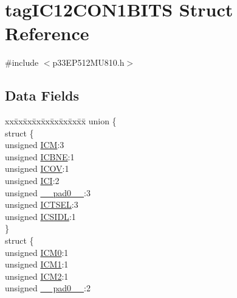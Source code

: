 \hypertarget{structtag_i_c12_c_o_n1_b_i_t_s}{}\section{tag\+I\+C12\+C\+O\+N1\+B\+I\+TS Struct Reference}
\label{structtag_i_c12_c_o_n1_b_i_t_s}


{\ttfamily \#include $<$p33\+E\+P512\+M\+U810.\+h$>$}

\subsection*{Data Fields}
\begin{DoxyCompactItemize}
\item 
\begin{tabbing}
xx\=xx\=xx\=xx\=xx\=xx\=xx\=xx\=xx\=\kill
union \{\\
\>struct \{\\
\>\>unsigned \hyperlink{structtag_i_c12_c_o_n1_b_i_t_s_ad3edde44ecb2d349ffa2decd0a251c20}{ICM}:3\\
\>\>unsigned \hyperlink{structtag_i_c12_c_o_n1_b_i_t_s_a824e7dcca83939e1b049d63ffcee33e9}{ICBNE}:1\\
\>\>unsigned \hyperlink{structtag_i_c12_c_o_n1_b_i_t_s_a49392949376ba0bf58cf8db889e86c94}{ICOV}:1\\
\>\>unsigned \hyperlink{structtag_i_c12_c_o_n1_b_i_t_s_a72486dcb868aad2d5c978494691356cc}{ICI}:2\\
\>\>unsigned \hyperlink{structtag_i_c12_c_o_n1_b_i_t_s_adf71f3d8410c1f1dbbc96680a92c49af}{\_\_pad0\_\_}:3\\
\>\>unsigned \hyperlink{structtag_i_c12_c_o_n1_b_i_t_s_a7a9dd41b5f93eb620df7fa336e452677}{ICTSEL}:3\\
\>\>unsigned \hyperlink{structtag_i_c12_c_o_n1_b_i_t_s_af441b36127c0bb7a35162dfc9a64103c}{ICSIDL}:1\\
\>\} \\
\>struct \{\\
\>\>unsigned \hyperlink{structtag_i_c12_c_o_n1_b_i_t_s_a649b1dd9bca75e558f37a9f52a829bd4}{ICM0}:1\\
\>\>unsigned \hyperlink{structtag_i_c12_c_o_n1_b_i_t_s_af3fe77ef9f8ca41ff11519f445e7bc77}{ICM1}:1\\
\>\>unsigned \hyperlink{structtag_i_c12_c_o_n1_b_i_t_s_a3c62c9cbbc3a406402126c932b709db8}{ICM2}:1\\
\>\>unsigned \hyperlink{structtag_i_c12_c_o_n1_b_i_t_s_adf71f3d8410c1f1dbbc96680a92c49af}{\_\_pad0\_\_}:2\\

\end{tabbing}
\end{DoxyCompactItemize}
